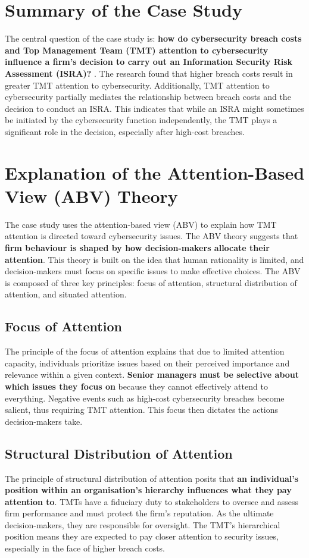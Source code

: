 \section{Summary of the Case Study}
The central question of the case study is: \textbf{how do cybersecurity breach costs and Top Management Team (TMT) attention to cybersecurity influence a firm's decision to carry out an Information Security Risk Assessment (ISRA)?} \citep{shaikh2023information}. The research found that higher breach costs result in greater TMT attention to cybersecurity. Additionally, TMT attention to cybersecurity partially mediates the relationship between breach costs and the decision to conduct an ISRA. This indicates that while an ISRA might sometimes be initiated by the cybersecurity function independently, the TMT plays a significant role in the decision, especially after high-cost breaches.

\section{Explanation of the Attention-Based View (ABV) Theory}
The case study uses the attention-based view (ABV) to explain how TMT attention is directed toward cybersecurity issues. The ABV theory suggests that \textbf{firm behaviour is shaped by how decision-makers allocate their attention}. This theory is built on the idea that human rationality is limited, and decision-makers must focus on specific issues to make effective choices. The ABV is composed of three key principles: focus of attention, structural distribution of attention, and situated attention.

    \subsection{Focus of Attention}
    The principle of the focus of attention explains that due to limited attention capacity, individuals prioritize issues based on their perceived importance and relevance within a given context. \textbf{Senior managers must be selective about which issues they focus on} because they cannot effectively attend to everything. Negative events such as high-cost cybersecurity breaches become salient, thus requiring TMT attention. This focus then dictates the actions decision-makers take.

    \subsection{Structural Distribution of Attention}
    The principle of structural distribution of attention posits that \textbf{an individual's position within an organisation's hierarchy influences what they pay attention to}. TMTs have a fiduciary duty to stakeholders to oversee and assess firm performance and must protect the firm's reputation. As the ultimate decision-makers, they are responsible for oversight. The TMT’s hierarchical position means they are expected to pay closer attention to security issues, especially in the face of higher breach costs.

